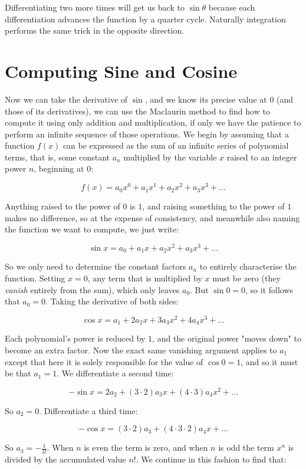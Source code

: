 Differentiating two more times will get us back to $\sin \theta$ because each differentiation advances the function by a quarter cycle. Naturally integration performs the same trick in the opposite direction.

\section{Computing Sine and Cosine}

Now we can take the derivative of $\sin$, and we know its precise value at $0$ (and those of its derivatives), we can use the Maclaurin method to find how to compute it using only addition and multiplication, if only we have the patience to perform an infinite sequence of those operations. We begin by assuming that a function $f(x)$ can be expressed as the sum of an infinite series of polynomial terms, that is, some constant $a_n$ multiplied by the variable $x$ raised to an integer power $n$, beginning at $0$:

$$
f(x) = a_0x^0 + a_1x^1 + a_2x^2 + a_3x^3 + \ldots
$$

Anything raised to the power of $0$ is $1$, and raising something to the power of $1$ makes no difference, so at the expense of consistency, and meanwhile also naming the function we want to compute, we just write:

$$
\sin x = a_0 + a_1x + a_2x^2 + a_3x^3 + \ldots
$$

So we only need to determine the constant factors $a_n$ to entirely characterise the function. Setting $x = 0$, any term that is multiplied by $x$ must be zero (they \textit{vanish} entirely from the sum), which only leaves $a_0$. But $\sin 0 = 0$, so it follows that $a_0 = 0$. Taking the derivative of both sides:

$$
\cos x = a_1 + 2a_2x + 3a_3x^2 + 4a_4x^3 + \ldots
$$

Each polynomial's power is reduced by $1$, and the original power "moves down" to become an extra factor. Now the exact same vanishing argument applies to $a_1$ except that here it is solely responsible for the value of $\cos 0 = 1$, and so it must be that $a_1 = 1$. We differentiate a second time:

$$
-\sin x = 2a_2 + (3\cdot2)a_3x + (4\cdot3)a_4x^2 + \ldots
$$

So $a_2 = 0$. Differentiate a third time:

$$
-\cos x = (3\cdot2)a_3 + (4\cdot3\cdot2)a_4x + \ldots
$$

So $a_3 = -\frac{1}{3!}$. When $n$ is even the term is zero, and when $n$ is odd the term $x^n$ is divided by the accumulated value $n!$. We continue in this fashion to find that:

